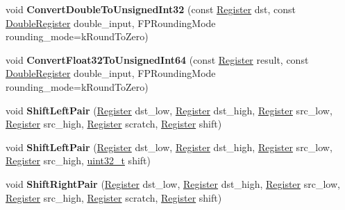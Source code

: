 \begin{DoxyCompactItemize}
\item 
\mbox{\label{classv8_1_1internal_1_1TurboAssembler_ac5de9174c3794ea8ebcbd9c1d52c0d0f}} 
void {\bfseries Convert\+Double\+To\+Unsigned\+Int32} (const \mbox{\hyperlink{classv8_1_1internal_1_1Register}{Register}} dst, const \mbox{\hyperlink{classv8_1_1internal_1_1DoubleRegister}{Double\+Register}} double\+\_\+input, F\+P\+Rounding\+Mode rounding\+\_\+mode=k\+Round\+To\+Zero)
\item 
\mbox{\label{classv8_1_1internal_1_1TurboAssembler_aaa9a8164edf45161998bdbd86fd3bd14}} 
void {\bfseries Convert\+Float32\+To\+Unsigned\+Int64} (const \mbox{\hyperlink{classv8_1_1internal_1_1Register}{Register}} result, const \mbox{\hyperlink{classv8_1_1internal_1_1DoubleRegister}{Double\+Register}} double\+\_\+input, F\+P\+Rounding\+Mode rounding\+\_\+mode=k\+Round\+To\+Zero)
\item 
\mbox{\label{classv8_1_1internal_1_1TurboAssembler_a0364a4d6542750fcecbc2dfd75e93b7a}} 
void {\bfseries Shift\+Left\+Pair} (\mbox{\hyperlink{classv8_1_1internal_1_1Register}{Register}} dst\+\_\+low, \mbox{\hyperlink{classv8_1_1internal_1_1Register}{Register}} dst\+\_\+high, \mbox{\hyperlink{classv8_1_1internal_1_1Register}{Register}} src\+\_\+low, \mbox{\hyperlink{classv8_1_1internal_1_1Register}{Register}} src\+\_\+high, \mbox{\hyperlink{classv8_1_1internal_1_1Register}{Register}} scratch, \mbox{\hyperlink{classv8_1_1internal_1_1Register}{Register}} shift)
\item 
\mbox{\label{classv8_1_1internal_1_1TurboAssembler_acb36c65b1134f076db27f56dc48e1a84}} 
void {\bfseries Shift\+Left\+Pair} (\mbox{\hyperlink{classv8_1_1internal_1_1Register}{Register}} dst\+\_\+low, \mbox{\hyperlink{classv8_1_1internal_1_1Register}{Register}} dst\+\_\+high, \mbox{\hyperlink{classv8_1_1internal_1_1Register}{Register}} src\+\_\+low, \mbox{\hyperlink{classv8_1_1internal_1_1Register}{Register}} src\+\_\+high, \mbox{\hyperlink{classuint32__t}{uint32\+\_\+t}} shift)
\item 
\mbox{\label{classv8_1_1internal_1_1TurboAssembler_a2abd2f3fdefffba7bcabf0ec495c5e41}} 
void {\bfseries Shift\+Right\+Pair} (\mbox{\hyperlink{classv8_1_1internal_1_1Register}{Register}} dst\+\_\+low, \mbox{\hyperlink{classv8_1_1internal_1_1Register}{Register}} dst\+\_\+high, \mbox{\hyperlink{classv8_1_1internal_1_1Register}{Register}} src\+\_\+low, \mbox{\hyperlink{classv8_1_1internal_1_1Register}{Register}} src\+\_\+high, \mbox{\hyperlink{classv8_1_1internal_1_1Register}{Register}} scratch, \mbox{\hyperlink{classv8_1_1internal_1_1Register}{Register}} shift)

\end{DoxyCompactItemize}
